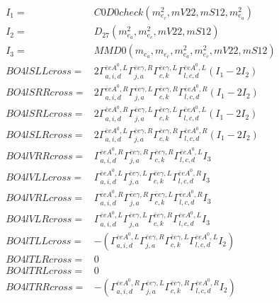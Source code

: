 \documentclass[A4,landscape]{article}
\begin{document}
\begin{align} 
I_1 = & C0D0check(m^2_{e_{{c}}}, mV22, mS12, m^2_{e_{{a}}}) \\ 
I_2 = & D_{27}(m^2_{e_{{a}}}, m^2_{e_{{c}}}, mV22, mS12) \\ 
I_3 = & MMD0(m_{e_{{a}}}, m_{e_{{c}}}, m^2_{e_{{a}}}, m^2_{e_{{c}}}, mV22, mS12) \\ 
  BO4lSLLcross= & 2  \Gamma^{\bar{e}e A^0 ,L}_{a, i, d} \Gamma^{\bar{e}e \gamma ,R}_{j, a} \Gamma^{\bar{e}e \gamma ,L}_{c, k} \Gamma^{\bar{e}e A^0 ,L}_{l, c, d} (I_1 - 2 I_2) \\ 
  BO4lSRRcross= & 2  \Gamma^{\bar{e}e A^0 ,R}_{a, i, d} \Gamma^{\bar{e}e \gamma ,L}_{j, a} \Gamma^{\bar{e}e \gamma ,R}_{c, k} \Gamma^{\bar{e}e A^0 ,R}_{l, c, d} (I_1 - 2 I_2) \\ 
  BO4lSRLcross= & 2  \Gamma^{\bar{e}e A^0 ,R}_{a, i, d} \Gamma^{\bar{e}e \gamma ,L}_{j, a} \Gamma^{\bar{e}e \gamma ,L}_{c, k} \Gamma^{\bar{e}e A^0 ,L}_{l, c, d} (I_1 - 2 I_2) \\ 
  BO4lSLRcross= & 2  \Gamma^{\bar{e}e A^0 ,L}_{a, i, d} \Gamma^{\bar{e}e \gamma ,R}_{j, a} \Gamma^{\bar{e}e \gamma ,R}_{c, k} \Gamma^{\bar{e}e A^0 ,R}_{l, c, d} (I_1 - 2 I_2) \\ 
  BO4lVRRcross= &  \Gamma^{\bar{e}e A^0 ,R}_{a, i, d} \Gamma^{\bar{e}e \gamma ,R}_{j, a} \Gamma^{\bar{e}e \gamma ,R}_{c, k} \Gamma^{\bar{e}e A^0 ,L}_{l, c, d} I_3 \\ 
  BO4lVLLcross= &  \Gamma^{\bar{e}e A^0 ,L}_{a, i, d} \Gamma^{\bar{e}e \gamma ,L}_{j, a} \Gamma^{\bar{e}e \gamma ,L}_{c, k} \Gamma^{\bar{e}e A^0 ,R}_{l, c, d} I_3 \\ 
  BO4lVRLcross= &  \Gamma^{\bar{e}e A^0 ,R}_{a, i, d} \Gamma^{\bar{e}e \gamma ,R}_{j, a} \Gamma^{\bar{e}e \gamma ,L}_{c, k} \Gamma^{\bar{e}e A^0 ,R}_{l, c, d} I_3 \\ 
  BO4lVLRcross= &  \Gamma^{\bar{e}e A^0 ,L}_{a, i, d} \Gamma^{\bar{e}e \gamma ,L}_{j, a} \Gamma^{\bar{e}e \gamma ,R}_{c, k} \Gamma^{\bar{e}e A^0 ,L}_{l, c, d} I_3 \\ 
  BO4lTLLcross= & -( \Gamma^{\bar{e}e A^0 ,L}_{a, i, d} \Gamma^{\bar{e}e \gamma ,R}_{j, a} \Gamma^{\bar{e}e \gamma ,L}_{c, k} \Gamma^{\bar{e}e A^0 ,L}_{l, c, d} I_2) \\ 
  BO4lTLRcross= & 0 \\ 
  BO4lTRLcross= & 0 \\ 
  BO4lTRRcross= & -( \Gamma^{\bar{e}e A^0 ,R}_{a, i, d} \Gamma^{\bar{e}e \gamma ,L}_{j, a} \Gamma^{\bar{e}e \gamma ,R}_{c, k} \Gamma^{\bar{e}e A^0 ,R}_{l, c, d} I_2) \\ 
\end{align} 
\end{document}
